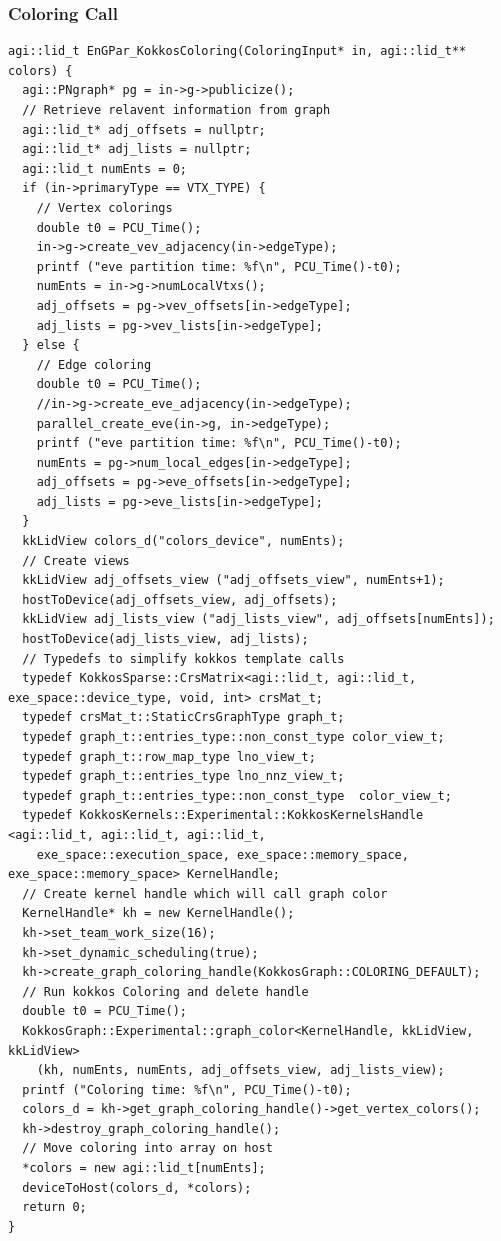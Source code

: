 \documentclass[graybox]{svmult}
\begin{document}
\subsubsection{Coloring Call}
{\small
\begin{verbatim}
agi::lid_t EnGPar_KokkosColoring(ColoringInput* in, agi::lid_t** colors) {
  agi::PNgraph* pg = in->g->publicize();
  // Retrieve relavent information from graph  
  agi::lid_t* adj_offsets = nullptr;
  agi::lid_t* adj_lists = nullptr;
  agi::lid_t numEnts = 0;
  if (in->primaryType == VTX_TYPE) {
    // Vertex colorings
    double t0 = PCU_Time();
    in->g->create_vev_adjacency(in->edgeType);
    printf ("eve partition time: %f\n", PCU_Time()-t0);
    numEnts = in->g->numLocalVtxs();
    adj_offsets = pg->vev_offsets[in->edgeType];
    adj_lists = pg->vev_lists[in->edgeType];
  } else {
    // Edge coloring
    double t0 = PCU_Time();
    //in->g->create_eve_adjacency(in->edgeType);
    parallel_create_eve(in->g, in->edgeType);
    printf ("eve partition time: %f\n", PCU_Time()-t0);
    numEnts = pg->num_local_edges[in->edgeType];
    adj_offsets = pg->eve_offsets[in->edgeType];
    adj_lists = pg->eve_lists[in->edgeType];
  }
  kkLidView colors_d("colors_device", numEnts);
  // Create views
  kkLidView adj_offsets_view ("adj_offsets_view", numEnts+1);
  hostToDevice(adj_offsets_view, adj_offsets);
  kkLidView adj_lists_view ("adj_lists_view", adj_offsets[numEnts]);
  hostToDevice(adj_lists_view, adj_lists);
  // Typedefs to simplify kokkos template calls 
  typedef KokkosSparse::CrsMatrix<agi::lid_t, agi::lid_t, exe_space::device_type, void, int> crsMat_t;
  typedef crsMat_t::StaticCrsGraphType graph_t;
  typedef graph_t::entries_type::non_const_type color_view_t;
  typedef graph_t::row_map_type lno_view_t;
  typedef graph_t::entries_type lno_nnz_view_t;
  typedef graph_t::entries_type::non_const_type  color_view_t;
  typedef KokkosKernels::Experimental::KokkosKernelsHandle <agi::lid_t, agi::lid_t, agi::lid_t,
    exe_space::execution_space, exe_space::memory_space, exe_space::memory_space> KernelHandle;
  // Create kernel handle which will call graph color
  KernelHandle* kh = new KernelHandle();
  kh->set_team_work_size(16);
  kh->set_dynamic_scheduling(true);
  kh->create_graph_coloring_handle(KokkosGraph::COLORING_DEFAULT);
  // Run kokkos Coloring and delete handle
  double t0 = PCU_Time();
  KokkosGraph::Experimental::graph_color<KernelHandle, kkLidView, kkLidView>
    (kh, numEnts, numEnts, adj_offsets_view, adj_lists_view);
  printf ("Coloring time: %f\n", PCU_Time()-t0);
  colors_d = kh->get_graph_coloring_handle()->get_vertex_colors();
  kh->destroy_graph_coloring_handle();
  // Move coloring into array on host 
  *colors = new agi::lid_t[numEnts];
  deviceToHost(colors_d, *colors);
  return 0;
}
\end{verbatim}
}
\end{document}
